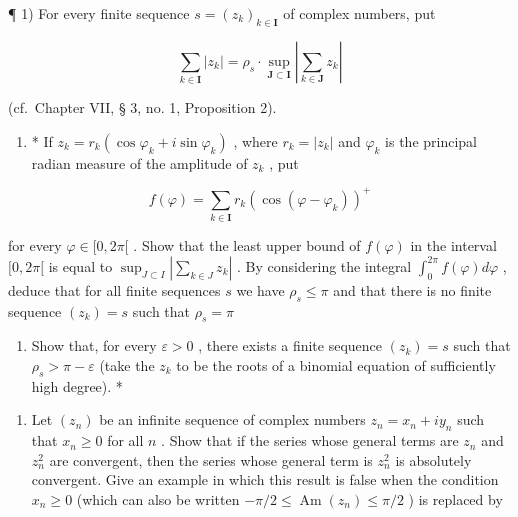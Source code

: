 \ExerciseSection

¶ 1) For every finite sequence \(s = (z_k)_{k \in \mathbf{I}}\) of complex numbers, put

\[
\sum_ {k \in \mathbf {I}} | z _ {k} | = \rho_ {s} \cdot \sup _ {\mathbf {J} \subset \mathbf {I}} \left| \sum_ {k \in \mathbf {J}} z _ {k} \right|
\]

(cf.~Chapter VII, § 3, no. 1, Proposition 2).

\begin{enumerate}
\def\labelenumi{\alph{enumi})}
\tightlist
\item
  * If \(z_{k} = r_{k} (\cos \varphi_{k} + i \sin \varphi_{k})\) , where \(r_{k} = |z_{k}|\) and \(\varphi_{k}\) is the principal radian measure of the amplitude of \(z_{k}\) , put
\end{enumerate}

\[
f (\varphi) = \sum_ {k \in \mathbf {I}} r _ {k} (\cos (\varphi - \varphi_ {k})) ^ {+}
\]

for every \(\varphi \in [0, 2\pi[\) . Show that the least upper bound of \(f(\varphi)\) in the interval \([0, 2\pi[\) is equal to \(\sup_{J \subset I} \left| \sum_{k \in J} z_k \right|\) . By considering the integral \(\int_0^{2\pi}f(\varphi)d\varphi\) , deduce that for all finite sequences \(s\) we have \(\rho_{s}\leqslant \pi\) and that there is no finite sequence \((z_k) = s\) such that \(\rho_{s} = \pi\)

\begin{enumerate}
\def\labelenumi{\alph{enumi})}
\setcounter{enumi}{1}
\tightlist
\item
  Show that, for every \(\varepsilon > 0\) , there exists a finite sequence \((z_k) = s\) such that \(\rho_s > \pi - \varepsilon\) (take the \(z_k\) to be the roots of a binomial equation of sufficiently high degree). *
\end{enumerate}

\begin{enumerate}
\def\labelenumi{\arabic{enumi})}
\setcounter{enumi}{1}
\tightlist
\item
  Let \((z_{n})\) be an infinite sequence of complex numbers \(z_{n} = x_{n} + iy_{n}\) such that \(x_{n} \geqslant 0\) for all \(n\) . Show that if the series whose general terms are \(z_{n}\) and \(z_{n}^{2}\) are convergent, then the series whose general term is \(z_{n}^{2}\) is absolutely convergent. Give an example in which this result is false when the condition \(x_{n} \geqslant 0\) (which can also be written \(-\pi / 2 \leqslant \operatorname{Am}(z_{n}) \leqslant \pi / 2\) ) is replaced by
\end{enumerate}

